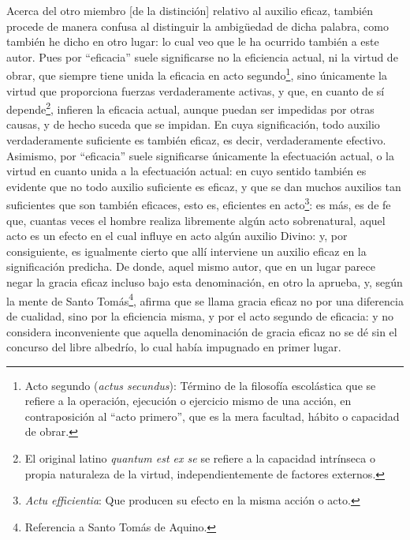 \documentclass{article}
\begin{document}
Acerca del otro miembro [de la distinción] relativo al auxilio eficaz, también procede
de manera confusa al distinguir la ambigüedad de dicha palabra, como también he dicho en
otro lugar: lo cual veo que le ha ocurrido también a este autor. Pues por
\enquote{eficacia} suele significarse no la eficiencia actual, ni la virtud de obrar,
que siempre tiene unida la eficacia en acto segundo\footnote{Acto segundo (\textit{actus
secundus}): Término de la filosofía escolástica que se refiere a la operación, ejecución
o ejercicio mismo de una acción, en contraposición al \enquote{acto primero}, que es la
mera facultad, hábito o capacidad de obrar.}, sino únicamente la virtud que proporciona
fuerzas verdaderamente activas, y que, en cuanto de sí depende\footnote{El original
latino \textit{quantum est ex se} se refiere a la capacidad intrínseca o propia
naturaleza de la virtud, independientemente de factores externos.}, infieren la eficacia
actual, aunque puedan ser impedidas por otras causas, y de hecho suceda que se impidan.
En cuya significación, todo auxilio verdaderamente suficiente es también eficaz, es
decir, verdaderamente efectivo. Asimismo, por \enquote{eficacia} suele significarse
únicamente la efectuación actual, o la virtud en cuanto unida a la efectuación actual:
en cuyo sentido también es evidente que no todo auxilio suficiente es eficaz, y que se
dan muchos auxilios tan suficientes que son también eficaces, esto es, eficientes en
acto\footnote{\textit{Actu efficientia}: Que producen su efecto en la misma acción o
acto.}: es más, es de fe que, cuantas veces el hombre realiza libremente algún acto
sobrenatural, aquel acto es un efecto en el cual influye en acto algún auxilio Divino:
y, por consiguiente, es igualmente cierto que allí interviene un auxilio eficaz en la
significación predicha. De donde, aquel mismo autor, que en un lugar parece negar la
gracia eficaz incluso bajo esta denominación, en otro la aprueba, y, según la mente de
Santo Tomás\footnote{Referencia a Santo Tomás de Aquino.}, afirma que se llama gracia
eficaz no por una diferencia de cualidad, sino por la eficiencia misma, y por el acto
segundo de eficacia: y no considera inconveniente que aquella denominación de gracia
eficaz no se dé sin el concurso del libre albedrío, lo cual había impugnado en primer
lugar.
\end{document}
